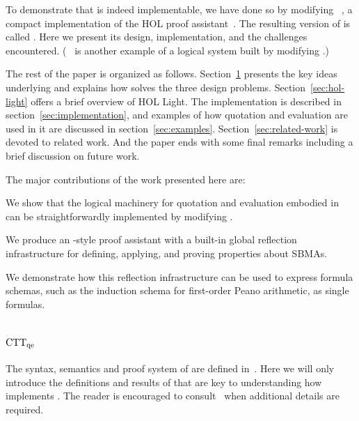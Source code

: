 \documentclass[fleqn]{llncs}
\begin{document}
To demonstrate that {\churchqe} is indeed implementable, we have done
so by modifying \HL~\cite{Harrison09}, a compact implementation of the
HOL proof assistant~\cite{GordonMelham93}.  The resulting version of
{\HL} is called \HLQE.  Here we present its design, implementation,
and the challenges encountered.  ({\HOLtwoP}~\cite{Voelker07} is another
example of a logical system built by modifying {\HL}.)

The rest of the paper is organized as follows.
Section~\ref{sec:ctt-qe} presents the key ideas underlying {\churchqe}
and explains how {\churchqe} solves the three design problems.
Section~\ref{sec:hol-light} offers a brief overview of HOL
Light.  The \HLQE{} implementation is described in
section~\ref{sec:implementation}, and examples of how quotation and
evaluation are used in it are discussed in section~\ref{sec:examples}.
Section~\ref{sec:related-work} is devoted to related work.  And the
paper ends with some final remarks including a brief discussion on future work.

The major contributions of the work presented here are:

\vspace*{-2.5mm}
\be

  \item We show that the logical machinery for quotation and
    evaluation embodied in {\churchqe} can be straightforwardly
    implemented by modifying {\HL}.

  \item We produce an {\HOL}-style proof assistant with a built-in
    global reflection infrastructure for defining, applying, and
    proving properties about SBMAs.

  \item We demonstrate how this reflection infrastructure can be used
    to express formula schemas, such as the induction schema for
    first-order Peano arithmetic, as single formulas.

\ee

\section{${\rm CTT_{qe}}$}\label{sec:ctt-qe}

The syntax, semantics and proof system of {\churchqe}
are defined in~\cite{Farmer18}.  Here
we will only introduce the definitions and results of that
are key to understanding how \HLQE{} implements {\churchqe}.  The
reader is encouraged to consult~\cite{Farmer18} when additional
details are required.
\end{document}
